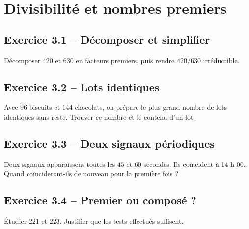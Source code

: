 \chapter{Divisibilité et nombres premiers}
\label{exercices:03}
\section*{Exercice 3.1 -- Décomposer et simplifier}
Décomposer $420$ et $630$ en facteurs premiers, puis rendre $420/630$ irréductible.

\section*{Exercice 3.2 -- Lots identiques}
Avec $96$ biscuits et $144$ chocolats, on prépare le plus grand nombre de lots identiques sans reste. Trouver ce nombre et le contenu d'un lot.

\section*{Exercice 3.3 -- Deux signaux périodiques}
Deux signaux apparaissent toutes les $45$ et $60$ secondes. Ils coïncident à 14 h 00. Quand coïncideront-ils de nouveau pour la première fois ?

\section*{Exercice 3.4 -- Premier ou composé ?}
Étudier $221$ et $223$. Justifier que les tests effectués suffisent.

